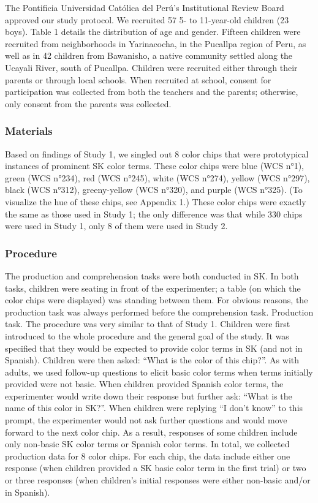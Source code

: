 \documentclass[man]{apa6}
\theoremstyle{definition}
\theoremstyle{definition}
\theoremstyle{definition}
\theoremstyle{remark}
\begin{document}
The Pontificia Universidad Católica del Perú's Institutional Review
Board approved our study protocol. We recruited 57 5- to 11-year-old
children (23 boys). Table 1 details the distribution of age and gender.
Fifteen children were recruited from neighborhoods in Yarinacocha, in
the Pucallpa region of Peru, as well as in 42 children from Bawanisho, a
native community settled along the Ucayali River, south of Pucallpa.
Children were recruited either through their parents or through local
schools. When recruited at school, consent for participation was
collected from both the teachers and the parents; otherwise, only
consent from the parents was collected.

\subsubsection{Materials}\label{materials-1}

Based on findings of Study 1, we singled out 8 color chips that were
prototypical instances of prominent SK color terms. These color chips
were blue (WCS n°1), green (WCS n°234), red (WCS n°245), white (WCS
n°274), yellow (WCS n°297), black (WCS n°312), greeny-yellow (WCS
n°320), and purple (WCS n°325). (To visualize the hue of these chips,
see Appendix 1.) These color chips were exactly the same as those used
in Study 1; the only difference was that while 330 chips were used in
Study 1, only 8 of them were used in Study 2.

\subsubsection{Procedure}\label{procedure-1}

The production and comprehension tasks were both conducted in SK. In
both tasks, children were seating in front of the experimenter; a table
(on which the color chips were displayed) was standing between them. For
obvious reasons, the production task was always performed before the
comprehension task. Production task. The procedure was very similar to
that of Study 1. Children were first introduced to the whole procedure
and the general goal of the study. It was specified that they would be
expected to provide color terms in SK (and not in Spanish). Children
were then asked: \enquote{What is the color of this chip?}. As with
adults, we used follow-up questions to elicit basic color terms when
terms initially provided were not basic. When children provided Spanish
color terms, the experimenter would write down their response but
further ask: \enquote{What is the name of this color in SK?}. When
children were replying \enquote{I don't know} to this prompt, the
experimenter would not ask further questions and would move forward to
the next color chip. As a result, responses of some children include
only non-basic SK color terms or Spanish color terms. In total, we
collected production data for 8 color chips. For each chip, the data
include either one response (when children provided a SK basic color
term in the first trial) or two or three responses (when children's
initial responses were either non-basic and/or in Spanish).
\end{document}
